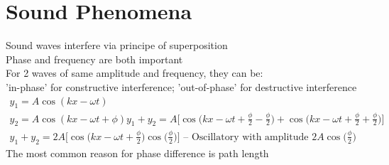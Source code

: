 \documentclass[a4paper, 11pt, fleqn, normalem]{report}
\begin{document}
\section{Sound Phenomena}
Sound waves interfere via principe of superposition \\
Phase and frequency are both important \\
For 2 waves of same amplitude and frequency, they can be: \\
'in-phase' for constructive interference; 'out-of-phase' for destructive interference
\begin{gather*}
    y_{1} = A\cos{(kx - \omega t)} \\
    y_{2} = A\cos{(kx - \omega t + \phi)}
    y_{1} + y_{2} = A\Big[\cos{\Big(kx - \omega t + \frac{\phi}{2} - \frac{\phi}{2}\Big)} + \cos{\Big(kx - \omega t + \frac{\phi}{2} + \frac{\phi}{2}\Big)}\Big] \\
    y_{1} + y_{2} = 2A\Big[\cos{\Big(kx - \omega t + \frac{\phi}{2}\Big)}\cos{\Big(\frac{\phi}{2}\Big)}\Big]\text{ -- Oscillatory with amplitude }2A\cos{\Big(\frac{\phi}{2}\Big)}
\end{gather*}
The most common reason for phase difference is path length
\end{document}
